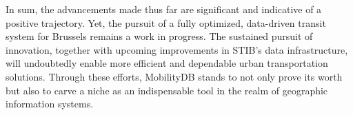 \documentclass[12pt]{report}
\begin{document}
	In sum, the advancements made thus far are significant and indicative of a positive trajectory. Yet, the pursuit of a fully optimized, data-driven transit system for Brussels remains a work in progress. The sustained pursuit of innovation, together with upcoming improvements in STIB's data infrastructure, will undoubtedly enable more efficient and dependable urban transportation solutions. Through these efforts, MobilityDB stands to not only prove its worth but also to carve a niche as an indispensable tool in the realm of geographic information systems.
	
	
	
	\printbibliography	
\end{document}
